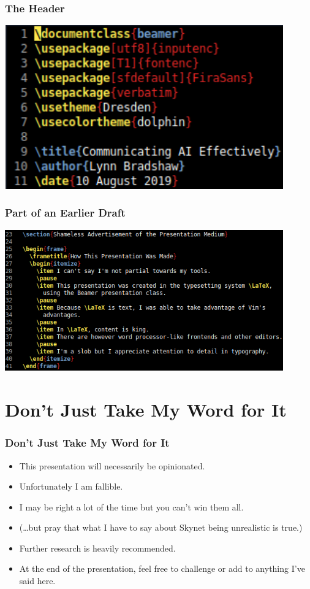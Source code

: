 \documentclass[10pt]{beamer}
\begin{document}
  \begin{frame}
    \frametitle{The Header}
    \begin{center}
      \includegraphics[width=0.9\textwidth]{latex-header.png}
    \end{center}
  \end{frame}

  \begin{frame}
    \frametitle{Part of an Earlier Draft}
    \begin{center}
      \includegraphics[width=0.9\textwidth]{latex-section-and-frame.png}
    \end{center}
  \end{frame}

  \section{Don't Just Take My Word for It}

  \begin{frame}
    \frametitle{Don't Just Take My Word for It}

    \begin{itemize}
      \item This presentation will necessarily be opinionated.
      \pause
      \item Unfortunately I am fallible.
      \pause
      \item I may be right a lot of the time but you can't win them all.
      \pause
      \item (\ldots{}but pray that what I have to say about Skynet being
        unrealistic is true.)
      \pause
      \item Further research is heavily recommended.
      \pause
      \item At the end of the presentation, feel free to challenge or add to
        anything I've said here.
    \end{itemize}
  \end{frame}
\end{document}
